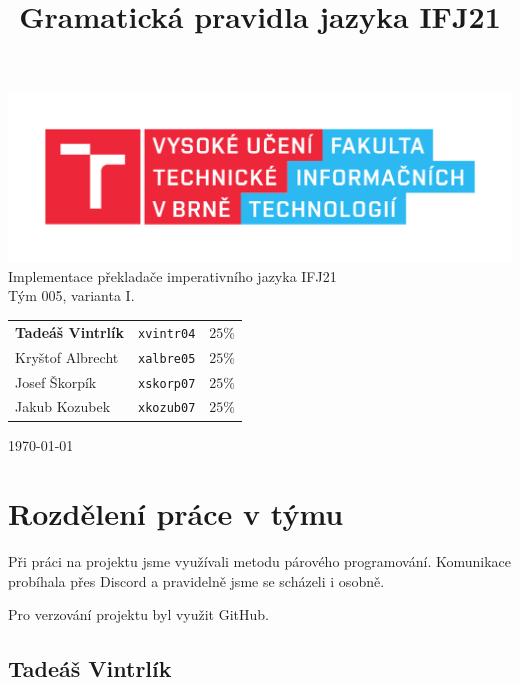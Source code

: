 \documentclass[a4paper]{article}
\title{Gramatická pravidla jazyka IFJ21}
\theoremstyle{definition}
\begin{document}
	
\begin{titlepage}
	\begin{center}
	\includegraphics[width=\linewidth]{inc/FIT_logo.pdf}\\
	{\Huge
		Implementace překladače imperativního jazyka IFJ21\\[0.5em] Tým 005, varianta I.
	}\\
	\begin{minipage}{0.6\linewidth}
		\begin{center}
		\Large
		\begin{tabular}{l c r}
			\textbf{Tadeáš Vintrlík} & \texttt{xvintr04} & $25\%$ \\
			Kryštof Albrecht & \texttt{xalbre05} & $25\%$ \\
			Josef Škorpík & \texttt{xskorp07} & $25\%$ \\
			Jakub Kozubek & \texttt{xkozub07} & $25\%$ \\
		\end{tabular}
		\end{center}
	\end{minipage}
	\end{center}
	\vfill
	\today
\end{titlepage}

\newpage

\tableofcontents

\newpage

\section{Rozdělení práce v týmu}

Při práci na projektu jsme využívali metodu párového programování. Komunikace probíhala přes Discord a pravidelně jsme se scházeli i osobně.

Pro verzování projektu byl využit GitHub.

\subsection{Tadeáš Vintrlík}
\end{document}
